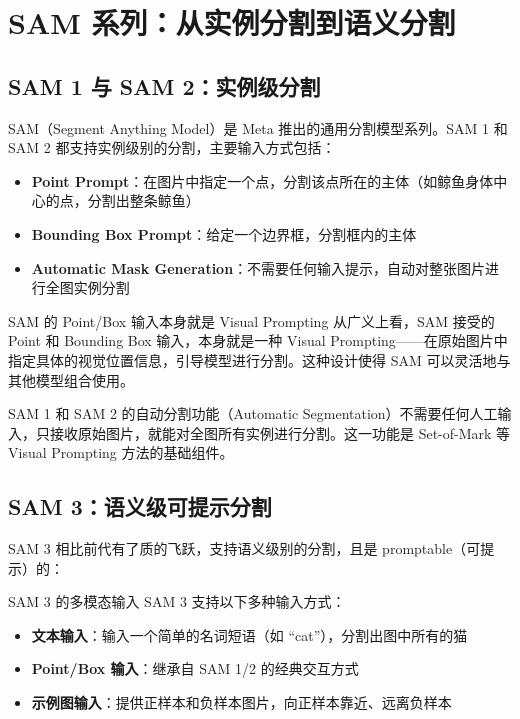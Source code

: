 \section{SAM 系列：从实例分割到语义分割}

\subsection{SAM 1 与 SAM 2：实例级分割}

SAM（Segment Anything Model）是 Meta 推出的通用分割模型系列。SAM 1 和 SAM 2 都支持实例级别的分割，主要输入方式包括：

\begin{itemize}
    \item \textbf{Point Prompt}：在图片中指定一个点，分割该点所在的主体（如鲸鱼身体中心的点，分割出整条鲸鱼）
    \item \textbf{Bounding Box Prompt}：给定一个边界框，分割框内的主体
    \item \textbf{Automatic Mask Generation}：不需要任何输入提示，自动对整张图片进行全图实例分割
\end{itemize}

\begin{knowledgebox}{SAM 的 Point/Box 输入本身就是 Visual Prompting}
从广义上看，SAM 接受的 Point 和 Bounding Box 输入，本身就是一种 Visual Prompting——在原始图片中指定具体的视觉位置信息，引导模型进行分割。这种设计使得 SAM 可以灵活地与其他模型组合使用。
\end{knowledgebox}

SAM 1 和 SAM 2 的自动分割功能（Automatic Segmentation）不需要任何人工输入，只接收原始图片，就能对全图所有实例进行分割。这一功能是 Set-of-Mark 等 Visual Prompting 方法的基础组件。

\subsection{SAM 3：语义级可提示分割}

SAM 3 相比前代有了质的飞跃，支持语义级别的分割，且是 promptable（可提示）的：

\begin{importantbox}{SAM 3 的多模态输入}
SAM 3 支持以下多种输入方式：
\begin{itemize}
    \item \textbf{文本输入}：输入一个简单的名词短语（如 ``cat''），分割出图中所有的猫
    \item \textbf{Point/Box 输入}：继承自 SAM 1/2 的经典交互方式
    \item \textbf{示例图输入}：提供正样本和负样本图片，向正样本靠近、远离负样本
\end{itemize}
\end{importantbox}

